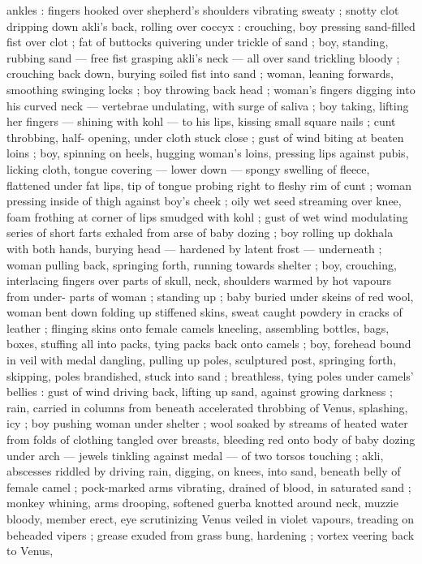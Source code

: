 ankles : fingers hooked over shepherd’s shoulders vibrating sweaty
; snotty clot dripping down akli’s back, rolling over coccyx :
crouching, boy pressing sand-filled fist over clot ; fat of buttocks
quivering under trickle of sand ; boy, standing, rubbing sand --- free
fist grasping akli's neck --- all over sand trickling bloody ; crouching
back down, burying soiled fist into sand ; woman, leaning forwards,
smoothing swinging locks ; boy throwing back head ; woman's
fingers digging into his curved neck --- vertebrae undulating, with
surge of saliva ; boy taking, lifting her fingers --- shining with kohl
--- to his lips, kissing small square nails ; cunt throbbing, half-
opening, under cloth stuck close ; gust of wind biting at beaten loins
; boy, spinning on heels, hugging woman's loins, pressing lips
against pubis, licking cloth, tongue covering --- lower down ---
spongy swelling of fleece, flattened under fat lips, tip of tongue
probing right to fleshy rim of cunt ; woman pressing inside of thigh
against boy's cheek ; oily wet seed streaming over knee, foam
frothing at corner of lips smudged with kohl ; gust of wet wind
modulating series of short farts exhaled from arse of baby dozing ;
boy rolling up dokhala with both hands, burying head --- hardened
by latent frost --- underneath ; woman pulling back, springing forth,
running towards shelter ; boy, crouching, interlacing fingers over
parts of skull, neck, shoulders warmed by hot vapours from under-
parts of woman ; standing up ; baby buried under skeins of red wool,
woman bent down folding up stiffened skins, sweat caught powdery
in cracks of leather ; flinging skins onto female camels kneeling,
assembling bottles, bags, boxes, stuffing all into packs, tying packs
back onto camels ; boy, forehead bound in veil with medal dangling,
pulling up poles, sculptured post, springing forth, skipping, poles
brandished, stuck into sand ; breathless, tying poles under camels’
bellies : gust of wind driving back, lifting up sand, against growing
darkness ; rain, carried in columns from beneath accelerated
throbbing of Venus, splashing, icy ; boy pushing woman under
shelter ; wool soaked by streams of heated water from folds of
clothing tangled over breasts, bleeding red onto body of baby
dozing under arch --- jewels tinkling against medal --- of two torsos
touching ; akli, abscesses riddled by driving rain, digging, on knees,
into sand, beneath belly of female camel ; pock-marked arms
vibrating, drained of blood, in saturated sand ; monkey whining,
arms drooping, softened guerba knotted around neck, muzzie
bloody, member erect, eye scrutinizing Venus veiled in violet
vapours, treading on beheaded vipers ; grease exuded from grass
bung, hardening ; vortex veering back to Venus,

